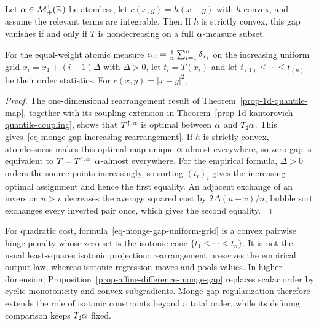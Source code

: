 \begin{prop}\label{prop-monge-gap-one-dimensional}
	Let $\alpha\in\mathcal{M}_+^1(\mathbb{R})$ be atomless, let $c(x,y)=h(x-y)$ with $h$ convex, and assume the relevant terms are integrable. Then
	If $h$ is strictly convex, this gap vanishes if and only if $T$ is nondecreasing on a full $\alpha$-measure subset.

	For the equal-weight atomic measure $\alpha_n=\frac1n\sum_{i=1}^n\delta_{x_i}$ on the increasing uniform grid $x_i=x_1+(i-1)\Delta$ with $\Delta>0$, let $t_i=T(x_i)$ and let $t_{(1)}\leq\cdots\leq t_{(n)}$ be their order statistics. For $c(x,y)=|x-y|^2$,
\end{prop}
\begin{proof}
	The one-dimensional rearrangement result of Theorem~\ref{prop-1d-quantile-map}, together with its coupling extension in Theorem~\ref{prop-1d-kantorovich-quantile-coupling}, shows that $T^{\uparrow,\alpha}$ is optimal between $\alpha$ and $T_\sharp\alpha$. This gives~\eqref{eq-monge-gap-increasing-rearrangement}. If $h$ is strictly convex, atomlessness makes this optimal map unique $\alpha$-almost everywhere, so zero gap is equivalent to $T=T^{\uparrow,\alpha}$ $\alpha$-almost everywhere. For the empirical formula, $\Delta>0$ orders the source points increasingly, so sorting $(t_i)_i$ gives the increasing optimal assignment and hence the first equality. An adjacent exchange of an inversion $u>v$ decreases the average squared cost by $2\Delta(u-v)/n$; bubble sort exchanges every inverted pair once, which gives the second equality.
\end{proof}

For quadratic cost, formula~\eqref{eq-monge-gap-uniform-grid} is a convex pairwise hinge penalty whose zero set is the isotonic cone $\{t_1\leq\cdots\leq t_n\}$. It is not the usual least-squares isotonic projection: rearrangement preserves the empirical output law, whereas isotonic regression moves and pools values. In higher dimension, Proposition~\ref{prop-affine-difference-monge-gap} replaces scalar order by cyclic monotonicity and convex subgradients. Monge-gap regularization therefore extends the role of isotonic constraints beyond a total order, while its defining comparison keeps $T_\sharp\alpha$ fixed.

